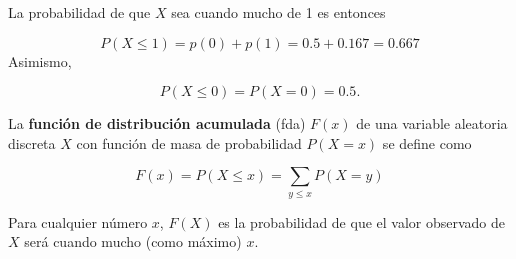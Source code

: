 \documentclass[
]{book}
\theoremstyle{definition}
\theoremstyle{definition}
\theoremstyle{definition}
\theoremstyle{definition}
\theoremstyle{remark}
\begin{document}
La probabilidad de que \(X\) sea cuando mucho de 1 es entonces

\[P(X \leq 1) = p(0) + p(1) = 0.5 + 0.167 = 0.667\]
Asimismo,

\[P(X \leq 0) = P(X = 0) = 0.5.\]

La \textbf{función de distribución acumulada} (fda) \(F(x)\) de una variable aleatoria discreta \(X\) con función de masa de probabilidad \(P(X=x)\) se define como

\begin{equation}
F(x) = P(X\leq x) =\displaystyle\sum_{y\leq x}P(X=y)
\label{eq:fdadiscreta}
\end{equation}

Para cualquier número \(x\), \(F(X)\) es la probabilidad de que el valor observado de \(X\) será cuando mucho (como máximo) \(x\). \citep[página 95]{Devore}
\end{document}
